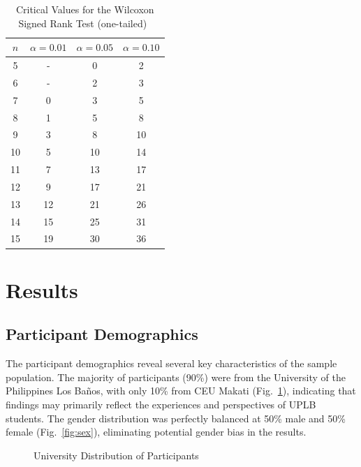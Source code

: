 \documentclass[sigconf,natbib=true]{acmart}
\begin{document}
\begin{table}
  \caption{Critical Values for the Wilcoxon Signed Rank Test (one-tailed)~\cite{webbWilcoxonSignedRanksTest2024}}\label{tab:crit}
  \begin{tabular}{cccc}
    \toprule
    $n$ & $\alpha = 0.01$ & $\alpha = 0.05$ & $\alpha = 0.10$ \\
    \midrule
    5 & - & 0 & 2 \\
    6 & - & 2 & 3 \\
    7 & 0 & 3 & 5 \\
    8 & 1 & 5 & 8 \\
    9 & 3 & 8 & 10 \\
    10 & 5 & 10 & 14 \\
    11 & 7 & 13 & 17 \\
    12 & 9 & 17 & 21 \\
    13 & 12 & 21 & 26 \\
    14 & 15 & 25 & 31 \\
    15 & 19 & 30 & 36 \\
    \bottomrule
  \end{tabular}
\end{table}

\section{Results}
\subsection{Participant Demographics}
The participant demographics reveal several key characteristics of the sample population. The majority of participants (90\%) were from the University of the Philippines Los Baños, with only 10\% from CEU Makati (Fig.~\ref{fig:university}), indicating that findings may primarily reflect the experiences and perspectives of UPLB students. The gender distribution was perfectly balanced at 50\% male and 50\% female (Fig.~\ref{fig:sex}), eliminating potential gender bias in the results. 

\begin{figure}[h]
  \centering
  \caption{University Distribution of Participants}\label{fig:university}
\end{figure}
\end{document}
